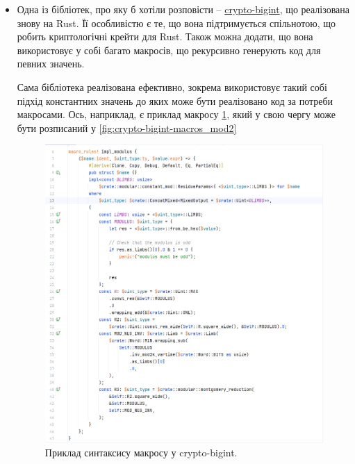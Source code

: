 \begin{itemize}

\item Одна із бібліотек, про яку б хотіли розповісти -- \href{https://crates.io/crates/crypto-bigint}{crypto-bigint}, що реалізована знову на Rust. Її особливістю є те, що вона підтримується спільнотою, що робить криптологічні крейти для Rust. Також можна додати, що вона використовує у собі багато макросів, що рекурсивно генерують код для певних значень.

	Сама бібліотека реалізована ефективно, зокрема використовує такий собі підхід константних значень до яких може бути реалізовано код за потреби макросами. 
	Ось, наприклад, є приклад макросу \ref{fig:crypto-bigint-macros_mod}, який у свою чергу може бути розписаний у \ref{fig:crypto-bigint-macros_mod2} 

	\begin{figure}[!h]
	    \centering
    		\includegraphics[scale = 0.45]{IMAGES/Rust/crypto-bigint-macros_mod}
	    \caption{Приклад синтаксису макросу у crypto-bigint.}
    		\label{fig:crypto-bigint-macros_mod}
	\end{figure}


\end{itemize}
